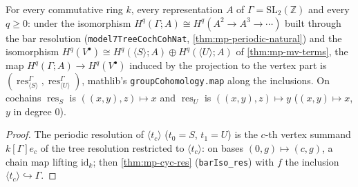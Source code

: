 \begin{theorem}\label{thm:mp-mv-res}
  \leanok
  For every commutative ring $k$, every representation $A$ of $\Gamma=\mathrm{SL}_2(\mathbb Z)$ and every $q\ge0$: under the
  isomorphism $H^q(\Gamma;A)\cong H^q(A^2\to A^3\to\cdots)$ built through the bar resolution
  (\texttt{model7TreeCochCohNat}, \ref{thm:mp-periodic-natural}) and the isomorphism $H^q(V^\bullet)\cong
  H^q(\langle S\rangle;A)\oplus H^q(\langle U\rangle;A)$ of \ref{thm:mp-mv-terms}, the map $H^q(\Gamma;A)\to H^q(V^\bullet)$
  induced by the projection to the vertex part is $(\operatorname{res}^\Gamma_{\langle S\rangle},\operatorname{res}^\Gamma_{\langle U\rangle})$,
  mathlib's \texttt{groupCohomology.map} along the inclusions.  On cochains $\operatorname{res}_S$ is $((x,y),z)\mapsto x$ and
  $\operatorname{res}_U$ is $((x,y),z)\mapsto y$ ($(x,y)\mapsto x$, $y$ in degree $0$).
\end{theorem}
\begin{proof}
  \leanok
  The periodic resolution of $\langle t_c\rangle$ ($t_0=S$, $t_1=U$) is the $c$-th vertex summand $k[\Gamma]e_c$ of the tree
  resolution restricted to $\langle t_c\rangle$: on bases $(0,g)\mapsto(c,g)$, a chain map lifting $\mathrm{id}_k$; then
  \ref{thm:mp-cyc-res} (\texttt{barIso\_res}) with $f$ the inclusion $\langle t_c\rangle\hookrightarrow\Gamma$.
\end{proof}

